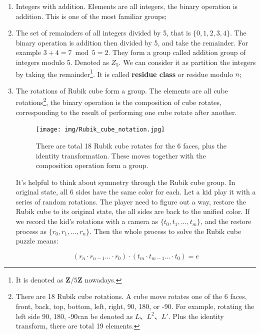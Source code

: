 \documentclass[b5paper]{article}
\begin{document}
\begin{enumerate}
\item Integers with addition. Elements are all integers, the binary operation is addition. This is one of the most familiar groups;

\item The set of remainders of all integers divided by 5, that is $\{0, 1, 2, 3, 4\}$. The binary operation is addition then divided by 5, and take the remainder. For example $3 + 4 = 7 \bmod 5 = 2$. They form a group called addition group of integers modulo 5. Denoted as $Z_5$. We can consider it as partition the integers by taking the remainder\footnote{It is denoted as $\pmb{Z}/5\pmb{Z}$ nowadays.}. It is called \textbf{residue class} or residue modulo $n$;

\item The rotations of Rubik cube form a group. The elements are all cube rotations\footnote{There are 18 Rubik cube rotations. A cube move rotates one of the 6 faces, front, back, top, bottom, left, right, 90\degree, 180\degree, or -90\degree. For example, rotating the left side 90\degree, 180\degree, -90\degree can be denoted as $L$、$L^2$、$L'$\cite{Wiki-Rubik-Cube-group}. Plus the identity transform, there are total 19 elements.}, the binary operation is the composition of cube rotates, corresponding to the result of performing one cube rotate after another.

\begin{figure}[htbp]
 \centering
 \texttt{[image: img/Rubik\_cube\_notation.jpg]}
 \caption{There are total 18 Rubik cube rotates for the 6 faces, plus the identity transformation. These moves together with the composition operation form a group.}
 \label{fig:Rubik-cube-notation}
\end{figure}

It's helpful to think about symmetry through the Rubik cube group. In original state, all 6 sides have the same color for each. Let a kid play it with a series of random rotations. The player need to figure out a way, restore the Rubik cube to its original state, the all sides are back to the unified color. If we record the kid's rotations with a camera as $\{t_0, t_1, ..., t_m\}$, and the restore process as $\{r_0, r_1, ..., r_n\}$. Then the whole process to solve the Rubik cube puzzle means:

\[
  (r_n \cdot r_{n-1} ... \cdot r_0) \cdot (t_m \cdot t_{m-1} ... \cdot t_0) = e
\]


\end{enumerate}
\end{document}
